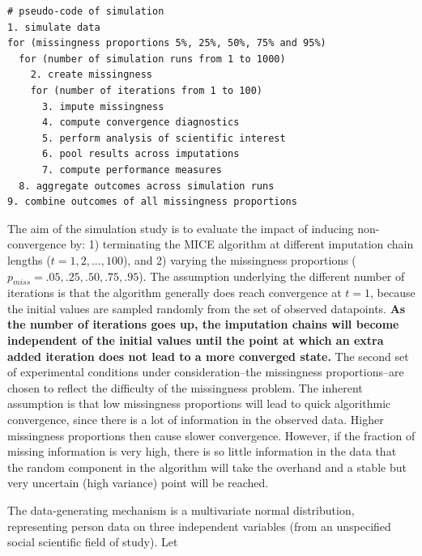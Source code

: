 \documentclass[Royal,times,sageh]{sagej}
\begin{document}
\begin{verbatim}
# pseudo-code of simulation 
1. simulate data 
for (missingness proportions 5%, 25%, 50%, 75% and 95%)
  for (number of simulation runs from 1 to 1000)
    2. create missingness
    for (number of iterations from 1 to 100)
      3. impute missingness
      4. compute convergence diagnostics
      5. perform analysis of scientific interest
      6. pool results across imputations
      7. compute performance measures
  8. aggregate outcomes across simulation runs 
9. combine outcomes of all missingness proportions
\end{verbatim}

The aim of the simulation study is to evaluate the impact of inducing
non-convergence by: 1) terminating the MICE algorithm at different
imputation chain lengths (\(t = 1, 2, ..., 100\)), and 2) varying the
missingness proportions (\(p_{miss} = .05, .25, .50, .75, .95\)). The
assumption underlying the different number of iterations is that the
algorithm generally does reach convergence at \(t=1\), because the
initial values are sampled randomly from the set of observed datapoints.
\textbf{As the number of iterations goes up, the imputation chains will
become independent of the initial values until the point at which an
extra added iteration does not lead to a more converged state.} The
second set of experimental conditions under consideration--the
missingness proportions--are chosen to reflect the difficulty of the
missingness problem. The inherent assumption is that low missingness
proportions will lead to quick algorithmic convergence, since there is a
lot of information in the observed data. Higher missingness proportions
then cause slower convergence. However, if the fraction of missing
information is very high, there is so little information in the data
that the random component in the algorithm will take the overhand and a
stable but very uncertain (high variance) point will be reached.

The data-generating mechanism is a multivariate normal distribution,
representing person data on three independent variables (from an
unspecified social scientific field of study). Let
\end{document}
